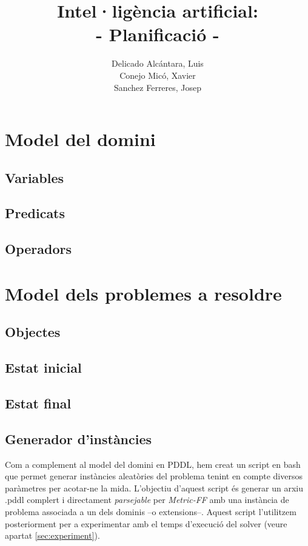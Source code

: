 \documentclass[11pt,a4paper]{article}
\author{
  Delicado Alcántara, Luis
  \\
  Conejo Micó, Xavier
  \\
  Sanchez Ferreres, Josep
}
\title{\Huge {Intel·ligència artificial:}\\ \huge{- Planificació -}}
\begin{document}
\begin{titlepage}
\clearpage\maketitle
\thispagestyle{empty}
\end{titlepage}

\clearpage

\tableofcontents

\newpage

\section{Model del domini}
\subsection{Variables}
\subsection{Predicats}
\subsection{Operadors}

\section{Model dels problemes a resoldre}
\subsection{Objectes}
\subsection{Estat inicial}
\subsection{Estat final}

\subsection{Generador d'instàncies}
\label{sec:script}

Com a complement al model del domini en PDDL, hem creat un script en bash que permet generar instàncies aleatòries del problema tenint en compte diversos paràmetres per acotar-ne la mida. L'objectiu d'aquest script és generar un arxiu .pddl complert i directament \emph{parsejable} per \emph{Metric-FF} amb una instància de problema associada a un dels dominis --o extensions--. Aquest script l'utilitzem posteriorment per a experimentar amb el temps d'execució del solver (veure apartat \ref{sec:experiment}).
\end{document}
